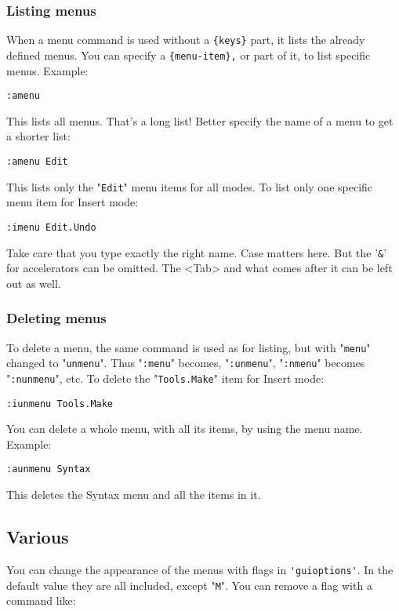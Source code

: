 \subsubsection{Listing menus}
When a menu command is used without a \verb!{keys}! part, it lists the already defined menus.
You can specify a \verb!{menu-item},! or part of it, to list specific menus.
Example:

\begin{Verbatim}[samepage=true]
 :amenu
\end{Verbatim}

This lists all menus.
That's a long list!  Better specify the name of a menu to get a shorter list:

\begin{Verbatim}[samepage=true]
 :amenu Edit
\end{Verbatim}

This lists only the "\verb!Edit!" menu items for all modes.
To list only one specific menu item for Insert mode:

\begin{Verbatim}[samepage=true]
 :imenu Edit.Undo
\end{Verbatim}

Take care that you type exactly the right name.
Case matters here.
But the '\verb!&!' for accelerators can be omitted.
The <Tab> and what comes after it can be left out as well.

\subsubsection{Deleting menus}
To delete a menu, the same command is used as for listing, but with "\verb!menu!" changed to "\verb!unmenu!".
Thus "\verb!:menu!" becomes, "\verb!:unmenu!", "\verb!:nmenu!" becomes "\verb!:nunmenu!", etc.
To delete the "\verb!Tools.Make!" item for Insert mode:

\begin{Verbatim}[samepage=true]
 :iunmenu Tools.Make
\end{Verbatim}

You can delete a whole menu, with all its items, by using the menu name.
Example:

\begin{Verbatim}[samepage=true]
 :aunmenu Syntax
\end{Verbatim}

This deletes the Syntax menu and all the items in it.
\subsection{Various}
You can change the appearance of the menus with flags in \verb!'guioptions'!.
In the default value they are all included, except "\verb!M!".
You can remove a flag with a command like:

